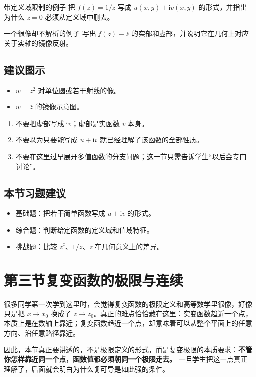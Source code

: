 \begin{lizi}{带定义域限制的例子}{}
把 $f(z)=1/z$ 写成 $u(x,y)+\mathrm{i}v(x,y)$ 的形式，并指出为什么 $z=0$ 必须从定义域中删去。
\end{lizi}

\begin{lizi}{一个很像却不解析的例子}{}
写出 $f(z)=\bar z$ 的实部和虚部，并说明它在几何上对应关于实轴的镜像反射。
\end{lizi}

\subsection*{建议图示}
\begin{itemize}
    \item $w=z^2$ 对单位圆或若干射线的像。
    \item $w=\bar z$ 的镜像示意图。
\end{itemize}

\begin{jinshi}[本节易错点]
\begin{enumerate}
    \item 不要把虚部写成 $\mathrm{i}v$；虚部是实函数 $v$ 本身。
    \item 不要以为只要能写成 $u+\mathrm{i}v$ 就已经理解了该函数的全部性质。
    \item 不要在这里过早展开多值函数的分支问题；这一节只需告诉学生``以后会专门讨论''。
\end{enumerate}
\end{jinshi}

\subsection*{本节习题建议}
\begin{itemize}
    \item 基础题：把若干简单函数写成 $u+\mathrm{i}v$ 的形式。
    \item 综合题：判断给定函数的定义域和值域特征。
    \item 挑战题：比较 $z^2$、$1/z$、$\bar z$ 在几何意义上的差异。
\end{itemize}

\section{第三节\quad 复变函数的极限与连续}

\begin{wulibj}[本节要解决的问题]
很多同学第一次学到这里时，会觉得复变函数的极限定义和高等数学里很像，好像只是把 $x\to x_0$ 换成了 $z\to z_0$。真正的难点恰恰藏在这里：实变函数趋近一个点，本质上是在数轴上靠近；复变函数趋近一个点，却意味着可以从整个平面上的任意方向、沿任意路径靠近。

因此，本节真正要讲透的，不是极限定义的形式，而是复变极限的本质要求：\textbf{不管你怎样靠近同一个点，函数值都必须朝同一个极限走去。} 一旦学生把这一点真正理解了，后面就会明白为什么复可导是如此强的条件。
\end{wulibj}

